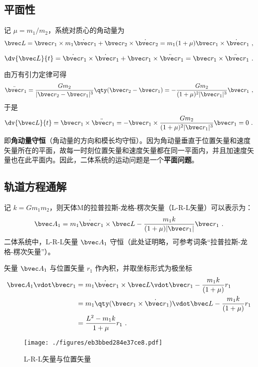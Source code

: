 \subsection{平面性}
 记 $\mu=m_1/m_2$，系统对质心的角动量为
\begin{equation}
\bvec L =\bvec r_1 \times m_1 \dot{\bvec r}_1+ \bvec r_2 \times \dot{\bvec r}_2 = m_1 (1+\mu)\bvec r_1 \times \dot{\bvec r}_1~,
\end{equation}

\begin{equation}
\dv{\bvec L}{t} = \dot{\bvec r}_1 \times \dot{\bvec r}_1 + \bvec r_1 \times \ddot{\bvec r}_1=\bvec r_1 \times \ddot{\bvec r}_1~.
\end{equation}

由万有引力定律可得
\begin{equation}\label{eq_ConDB_4}
\ddot{\bvec r}_1 = \frac{Gm_2}{|\bvec r_2 - \bvec r_1|^3} \qty(\bvec r_2 - \bvec r_1) = - \frac{Gm_2}{(1+\mu)^2|\bvec r_1|^3}\bvec r_1~,
\end{equation}
于是
\begin{equation}
\dv{\bvec L}{t} =\bvec r_1 \times \ddot{\bvec r}_1= -\bvec r_1 \times \frac{Gm_2}{(1+\mu)^2|\bvec r_1|^3}\bvec r_1= 0~.
\end{equation}
即\textbf{角动量守恒}（角动量的方向和模长均守恒）。因为角动量垂直于位置矢量和速度矢量所在的平面，故每一时刻位置矢量和速度矢量都在同一平面内，并且加速度矢量也在此平面内。因此，二体系统的运动问题是一个\textbf{平面问题}。

\subsection{轨道方程通解}
记 $k=Gm_1m_2$，则天体M的拉普拉斯-龙格-楞次矢量（L-R-L矢量）可以表示为：
\begin{equation}
\bvec A_1 = m_1\dot{\bvec r}_1 \times \bvec L - \frac{m_1k}{(1+\mu)|\bvec r_1|}\bvec r_1~.
\end{equation}
二体系统中，L-R-L矢量 $\bvec A_1$ 守恒（此处证明略，可参考词条“拉普拉斯-龙格-楞次矢量”）。

矢量 $\bvec A_1$ 与位置矢量 $r_1$ 作內积，并取坐标形式为极坐标
\begin{equation}\label{eq_ConDB_7}
\begin{aligned}
\bvec A_1 \vdot \bvec r_1 &= m_1\dot{\bvec r}_1 \times \bvec L \vdot \bvec r_1 - \frac{m_1k}{(1+\mu)}r_1\\
&= m_1\qty(\bvec r_1 \times \dot{\bvec r}_1)\vdot \bvec L - \frac{m_1k}{(1+\mu)}r_1 \\
&= \frac{L^2-m_1k}{1+\mu}r_1~.
\end{aligned}
\end{equation}
\begin{figure}[ht]
\centering
\texttt{[image: ./figures/eb3bbed284e37ce8.pdf]}
\caption{L-R-L矢量与位置矢量} \label{fig_ConDB_1}
\end{figure}

